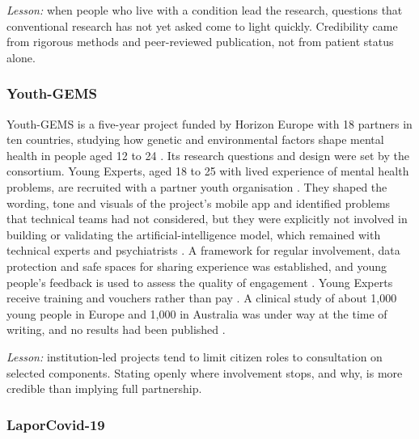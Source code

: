 \documentclass[
  number,
  preprint]{elsarticle}
\begin{document}
\emph{Lesson:} when people who live with a condition lead the research,
questions that conventional research has not yet asked come to light
quickly. Credibility came from rigorous methods and peer-reviewed
publication, not from patient status alone.

\subsubsection{Youth-GEMS}\label{youth-gems}

Youth-GEMS is a five-year project funded by Horizon Europe with 18
partners in ten countries, studying how genetic and environmental
factors shape mental health in people aged 12 to 24 \citep{prbb2023}.
Its research questions and design were set by the consortium. Young
Experts, aged 18 to 25 with lived experience of mental health problems,
are recruited with a partner youth organisation
\citep{youthgems_expert2025}. They shaped the wording, tone and visuals
of the project's mobile app and identified problems that technical teams
had not considered, but they were explicitly not involved in building or
validating the artificial-intelligence model, which remained with
technical experts and psychiatrists \citep{youthgems_decisions2025}. A
framework for regular involvement, data protection and safe spaces for
sharing experience was established, and young people's feedback is used
to assess the quality of engagement \citep{youthgems_earma2024}. Young
Experts receive training and vouchers rather than pay
\citep{youthgems_expert2025}. A clinical study of about 1,000 young
people in Europe and 1,000 in Australia was under way at the time of
writing, and no results had been published \citep{youthgems_research}.

\emph{Lesson:} institution-led projects tend to limit citizen roles to
consultation on selected components. Stating openly where involvement
stops, and why, is more credible than implying full partnership.

\subsubsection{LaporCovid-19}\label{laporcovid-19}
\end{document}
